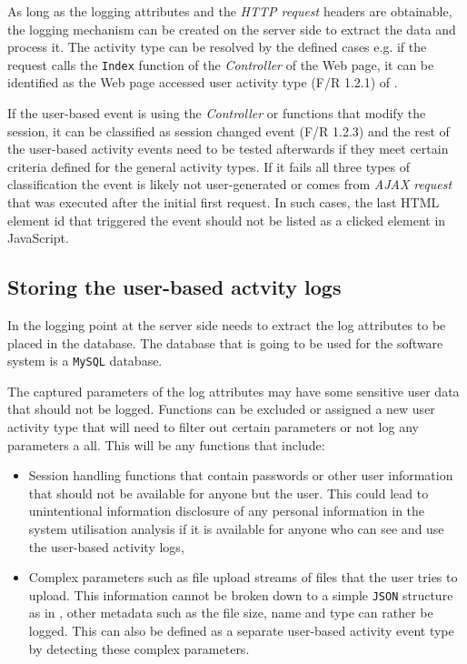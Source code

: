 As long as the logging attributes and the \textit{HTTP request} headers are obtainable, the logging mechanism can be created on the server side to extract the data and process it. The activity type can be resolved by the defined cases e.g. if the request calls the \texttt{Index} function of the \textit{Controller} of the Web page, it can be identified as the Web page accessed user activity type (F/R 1.2.1) of .\par If the user-based event is using the \textit{Controller} or functions that modify the session, it can be classified as session changed event (F/R 1.2.3) and the rest of the user-based activity events need to be tested afterwards if they meet certain criteria defined for the general activity types. If it fails all three types of classification the event is likely not user-generated or comes from \textit{AJAX request} that was executed after the initial first request. In such cases, the last HTML element id that triggered the event should not be listed as a clicked element in JavaScript.

\subsection{Storing the user-based actvity logs}
In  the logging point at the server side needs to extract the log attributes to be placed in the database. The database that is going to be used for the software system is a \texttt{MySQL} database.\par The captured parameters of the log attributes may have some sensitive user data that should not be logged. Functions can be excluded or assigned a new user activity type that will need to filter out certain parameters or not log any parameters a all. This will be any functions that include:

\begin{itemize}
	\item Session handling functions that contain passwords or other user information that should not be available for anyone but the user. This could lead to unintentional information disclosure of any personal information in the system utilisation analysis if it is available for anyone who can see and use the user-based activity logs,
	\item Complex parameters such as file upload streams of files that the user tries to upload. This information cannot be broken down to a simple \texttt{JSON} structure as in , other metadata such as the file size, name and type can rather be logged. This can also be defined as a separate user-based activity event type by detecting these complex parameters.
\end{itemize}

